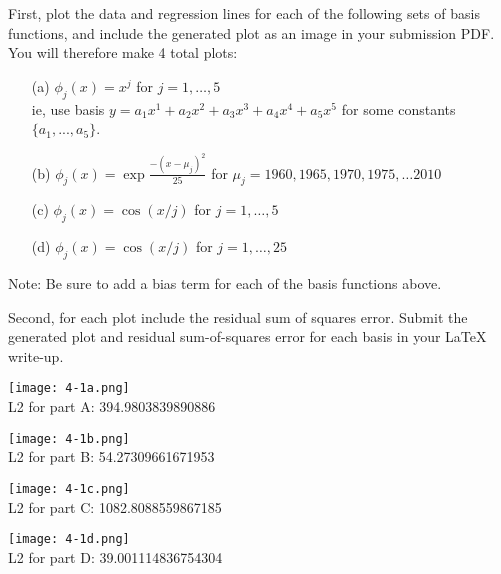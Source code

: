 \documentclass[submit]{harvardml}
\begin{document}
\begin{problem}
\begin{enumerate}
First, plot the data and regression lines for each of the following sets of basis functions, and include
the generated plot as an image in your submission PDF. You will therefore make 4 total plots:
\begin{enumerate}
	\item[(a)] $\phi_j(x) = x^j$ for $j=1, \ldots, 5$\\
    ie, use basis $y = a_1 x^1 + a_2 x^2 + a_3 x^3 + a_4 x^4 + a_5 x^5$ for some constants $\{a_1, ..., a_5\}$. 
    \item[(b)] $\phi_j(x) = \exp{\frac{-(x-\mu_j)^2}{25}}$ for $\mu_j=1960, 1965, 1970, 1975, \ldots 2010$
	\item[(c)] $\phi_j(x) = \cos(x / j)$ for $j=1, \ldots, 5$
	\item[(d)] $\phi_j(x) = \cos(x / j)$ for $j=1, \ldots, 25$
\end{enumerate}
\vspace{-2mm}
{\footnotesize * Note: Be sure to add a bias term for each of the basis functions above.}

Second, for each plot include the residual sum of squares error. Submit the generated plot and residual sum-of-squares error for each basis in your LaTeX write-up.
\end{enumerate}

\end{problem}

\newpage

\begin{framed}
      \begin{center}
        \texttt{[image: 4-1a.png]}      
        \\L2 for part A: 394.9803839890886
      \end{center}
      \begin{center}
        \texttt{[image: 4-1b.png]}
        \\L2 for part B: 54.27309661671953
      \end{center}
      \begin{center}
        \texttt{[image: 4-1c.png]}
        \\L2 for part C: 1082.8088559867185
      \end{center}
      \begin{center}
        \texttt{[image: 4-1d.png]}
        \\L2 for part D: 39.001114836754304
      \end{center}
\end{framed}
      
\end{document}
